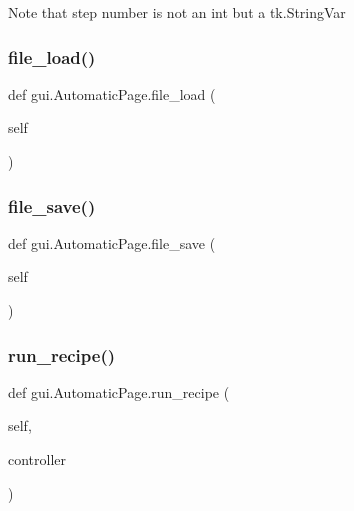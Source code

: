 \begin{DoxyVerb}Note that step number is not an int but a tk.StringVar
\end{DoxyVerb}
 \mbox{\label{classgui_1_1_automatic_page_ad4b9b8d05eba7460d0d4069223959459}} 
\subsubsection{\texorpdfstring{file\_load()}{file\_load()}}
{\footnotesize\ttfamily def gui.\+Automatic\+Page.\+file\+\_\+load (\begin{DoxyParamCaption}\item[{}]{self }\end{DoxyParamCaption})}

\mbox{\label{classgui_1_1_automatic_page_a010e9407e8dccee9b2fe19def99ad4e9}} 
\subsubsection{\texorpdfstring{file\_save()}{file\_save()}}
{\footnotesize\ttfamily def gui.\+Automatic\+Page.\+file\+\_\+save (\begin{DoxyParamCaption}\item[{}]{self }\end{DoxyParamCaption})}

\mbox{\label{classgui_1_1_automatic_page_ac239f947c6933ed3fdc11c5131c791c1}} 
\subsubsection{\texorpdfstring{run\_recipe()}{run\_recipe()}}
{\footnotesize\ttfamily def gui.\+Automatic\+Page.\+run\+\_\+recipe (\begin{DoxyParamCaption}\item[{}]{self,  }\item[{}]{controller }\end{DoxyParamCaption})}

